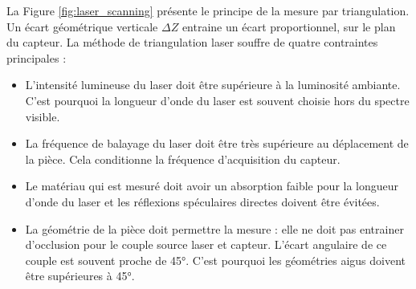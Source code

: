 La Figure \ref{fig:laser_scanning} présente le principe de la mesure par triangulation.
Un écart géométrique verticale $\Delta Z$ entraine un écart proportionnel, sur le plan du capteur.
La méthode de triangulation laser souffre de quatre contraintes principales :
\begin{itemize}
	\item L'intensité lumineuse du laser doit être supérieure à la luminosité ambiante. C'est pourquoi la longueur d'onde du laser est souvent choisie hors du spectre visible.
	\item La fréquence de balayage du laser doit être très supérieure au déplacement de la pièce. Cela conditionne la fréquence d'acquisition du capteur.
	\item Le matériau qui est mesuré doit avoir un absorption faible pour la longueur d'onde du laser et les réflexions spéculaires directes doivent être évitées.
	\item La géométrie de la pièce doit permettre la mesure : elle ne doit pas entrainer d'occlusion pour le couple source laser et capteur. L'écart angulaire de ce couple est souvent proche de 45°. C'est pourquoi les géométries aigus doivent être supérieures à 45°.
\end{itemize}



